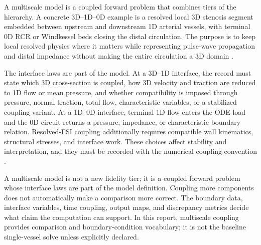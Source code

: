 \label{subsubsec:multiscale-models}

A multiscale model is a coupled forward problem that combines tiers of the
hierarchy. A concrete 3D--1D--0D example is a resolved local 3D stenosis segment
embedded between upstream and downstream 1D arterial vessels, with terminal
0D RCR or Windkessel beds closing the distal circulation. The purpose is to keep
local resolved physics where it matters while representing pulse-wave
propagation and distal impedance without making the entire circulation a 3D
domain
\cite{QuarteroniVeneziani2003GeometricalMultiscale}.

The interface laws are part of the model. At a 3D--1D interface, the record must
state which 3D cross-section is coupled, how 3D velocity and traction are reduced
to 1D flow or mean pressure, and whether compatibility is imposed through
pressure, normal traction, total flow, characteristic variables, or a stabilized
coupling variant. At a 1D--0D interface, terminal 1D flow enters the ODE load
and the 0D circuit returns a pressure, impedance, or characteristic boundary
relation. Resolved-FSI coupling additionally requires compatible wall
kinematics, structural stresses, and interface work. These choices affect
stability and interpretation, and they must be recorded with the numerical
coupling convention
\cite{FormaggiaEtAl2007FSICoupling}.

A multiscale model is not a new fidelity tier; it is a coupled forward problem
whose interface laws are part of the model definition. Coupling more components
does not automatically make a comparison more correct. The boundary data,
interface variables, time coupling, output maps, and discrepancy metrics decide
what claim the computation can support. In this report, multiscale coupling
provides comparison and boundary-condition vocabulary; it is not the baseline
single-vessel solve unless explicitly declared.
